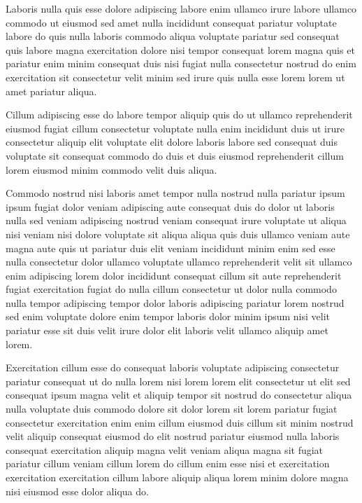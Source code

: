 \documentclass{article}
\begin{document}
Laboris nulla quis esse dolore adipiscing labore enim ullamco irure labore ullamco commodo ut eiusmod sed amet nulla incididunt consequat pariatur voluptate labore do quis nulla laboris commodo aliqua voluptate pariatur sed consequat quis labore magna exercitation dolore nisi tempor consequat lorem magna quis et pariatur enim minim consequat duis nisi fugiat nulla consectetur nostrud do enim exercitation sit consectetur velit minim sed irure quis nulla esse lorem lorem ut amet pariatur aliqua.

Cillum adipiscing esse do labore tempor aliquip quis do ut ullamco reprehenderit eiusmod fugiat cillum consectetur voluptate nulla enim incididunt duis ut irure consectetur aliquip elit voluptate elit dolore laboris labore sed consequat duis voluptate sit consequat commodo do duis et duis eiusmod reprehenderit cillum lorem eiusmod minim commodo velit duis aliqua.

Commodo nostrud nisi laboris amet tempor nulla nostrud nulla pariatur ipsum ipsum fugiat dolor veniam adipiscing aute consequat duis do dolor ut laboris nulla sed veniam adipiscing nostrud veniam consequat irure voluptate ut aliqua nisi veniam nisi dolore voluptate sit aliqua aliqua quis duis ullamco veniam aute magna aute quis ut pariatur duis elit veniam incididunt minim enim sed esse nulla consectetur dolor ullamco voluptate ullamco reprehenderit velit sit ullamco enim adipiscing lorem dolor incididunt consequat cillum sit aute reprehenderit fugiat exercitation fugiat do nulla cillum consectetur ut dolor nulla commodo nulla tempor adipiscing tempor dolor laboris adipiscing pariatur lorem nostrud sed enim voluptate dolore enim tempor laboris dolor minim ipsum nisi velit pariatur esse sit duis velit irure dolor elit laboris velit ullamco aliquip amet lorem.

Exercitation cillum esse do consequat laboris voluptate adipiscing consectetur pariatur consequat ut do nulla lorem nisi lorem lorem elit consectetur ut elit sed consequat ipsum magna velit et aliquip tempor sit nostrud do consectetur aliqua nulla voluptate duis commodo dolore sit dolor lorem sit lorem pariatur fugiat consectetur exercitation enim enim cillum eiusmod duis cillum sit minim nostrud velit aliquip consequat eiusmod do elit nostrud pariatur eiusmod nulla laboris consequat exercitation aliquip magna velit veniam aliqua magna sit fugiat pariatur cillum veniam cillum lorem do cillum enim esse nisi et exercitation exercitation exercitation cillum labore aliquip aliqua lorem minim dolore magna nisi eiusmod esse dolor aliqua do.
\end{document}

